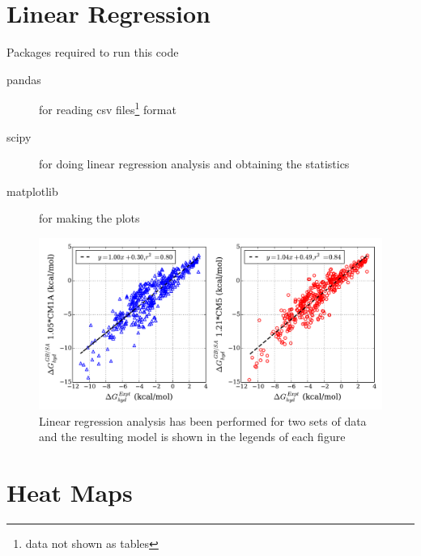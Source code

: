 \documentclass[11pt,fleqn]{book} %
\begin{document}
\chapter{Linear Regression}
Packages required to run this code
\begin{description}
  \item[pandas] for reading csv files\footnote{data not shown as tables} format
  \item[scipy] for doing linear regression analysis and obtaining the statistics
  \item[matplotlib] for making the plots
\end{description}
\pagebreak
\begin{figure}
\includegraphics[scale=0.55]{../python_recipies/GBSA_comp.pdf}
\caption{Linear regression analysis has been performed for two sets of data and the resulting model is shown in the legends of each figure}
\end{figure}





\chapter{Heat Maps}



\end{document}
